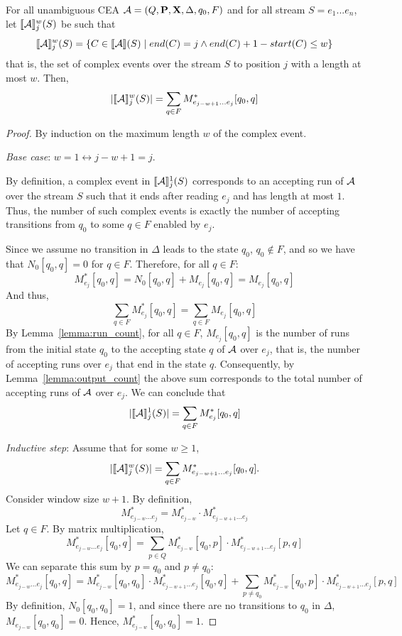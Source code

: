 \begin{theorem}
For all unambiguous CEA $\mathcal{A}= (Q, \textbf{P}, \textbf{X}, \Delta, q_0, F)$ and for all stream $S=e_1...e_n$, let $\llbracket\mathcal{A}\rrbracket_{j}^{w}(S)$ be such that
$$\llbracket\mathcal{A}\rrbracket_{j}^w(S) =
\{ C\in \llbracket\mathcal{A}\rrbracket(S) \mid end(C) = j \wedge end(C) + 1 - start(C) \leq w \}$$
that is, the set of complex events over the stream $S$ to position $j$ with a length at most $w$.
Then,
$$|\llbracket\mathcal{A}\rrbracket_{j}^w(S)| = \sum_{q\in F} M^*_{e_{j - w + 1}\dots e_j}[q_0,q] $$
\end{theorem}

\begin{proof}
By induction on the maximum length $w$ of the complex event.

\noindent \emph{Base case}: $w = 1 \longleftrightarrow j - w + 1 = j$.

    By definition, a complex event in $\llbracket\mathcal{A}\rrbracket_{j}^1(S)$ corresponds to an accepting run of $\mathcal{A}$ over the stream $S$ such that it ends after reading $e_j$ and has length at most $1$. Thus, the number of such complex events is exactly the number of accepting transitions from $q_0$ to some $q\in F$ enabled by $e_j$.    

    Since we assume no transition in $\Delta$ leads to the state $q_0$, $q_0\notin F$, and so we have that $N_0[q_0,q] = 0$ for $q\in F$. 
    Therefore, for all $q \in F$:
    \[
    M^*_{e_j}[q_0,q] = N_0[q_0,q] + M_{e_j}[q_0,q] = M_{e_j}[q_0,q] 
    \]
    And thus, 
    $$\sum_{q\in F} M^*_{e_j}[q_0,q] = \sum_{q\in F} M_{e_j}[q_0,q]$$
    By Lemma~\ref{lemma:run_count}, for all $q\in F$, $M_{e_j}[q_0,q]$ is the number of runs from the initial state $q_0$ to the accepting state $q$ of $\mathcal{A}$ over $e_j$, that is, the number of accepting runs over $e_j$ that end in the state $q$. 
    Consequently, by Lemma~\ref{lemma:output_count} the above sum corresponds to the total number of accepting runs of $\mathcal{A}$ over $e_j$.
    We can conclude that 
    $$|\llbracket\mathcal{A}\rrbracket_{j}^1(S)| = \sum_{q\in F} M^*_{e_j}[q_0,q]$$
    
\noindent \emph{Inductive step}: Assume that for some $w\geq 1$,
\[
|\llbracket\mathcal{A}\rrbracket_{j}^w(S)| = \sum_{q\in F} M^*_{e_{j - w + 1}\dots e_j}[q_0,q].
\]
Consider window size $w+1$.
By definition, $$M^*_{e_{j-w}\dots e_j} = M^*_{e_{j-w}} \cdot M^*_{e_{j-w + 1}\dots e_j} $$
Let $q\in F$. By matrix multiplication, 
$$M^*_{e_{j-w}\dots e_j}[q_0,q] = \sum_{p\in Q} M^*_{e_{j-w}}[q_0, p] \cdot M^*_{e_{j-w + 1}\dots e_j}[p, q] $$
We can separate this sum by $p = q_0$ and $p\neq q_0$:
$$M^*_{e_{j-w}\dots e_j}[q_0,q] = M^*_{e_{j-w}}[q_0, q_0] \cdot M^*_{e_{j-w + 1}\dots e_j}[q_0, q] + \sum_{p\neq q_0} M^*_{e_{j-w}}[q_0, p] \cdot M^*_{e_{j-w+1}\dots e_j}[p,q]$$
By definition, 
$N_0[q_0,q_0]=1$, and since there are no transitions to $q_0$ in $\Delta$, $M_{e_{j-w}}[q_0,q_0]=0$. Hence, $M^*_{e_{j-w}}[q_0, q_0] = 1$. 


\end{proof}
